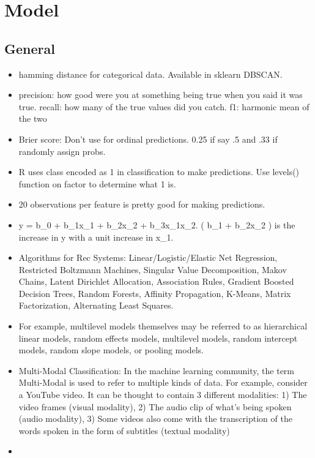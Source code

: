 \documentclass[]{book}
\theoremstyle{definition}
\theoremstyle{definition}
\theoremstyle{definition}
\theoremstyle{remark}
\begin{document}
\chapter{Model}\label{model-1}

\section{General}\label{general-1}

\begin{itemize}
\item
  hamming distance for categorical data. Available in sklearn DBSCAN.
\item
  precision: how good were you at something being true when you said it
  was true. recall: how many of the true values did you catch. f1:
  harmonic mean of the two
\item
  Brier score: Don't use for ordinal predictions. 0.25 if say .5 and .33
  if randomly assign probs.
\item
  R uses class encoded as 1 in classification to make predictions. Use
  levels() function on factor to determine what 1 is.
\item
  20 observations per feature is pretty good for making predictions.
\item
  y = b\_0 + b\_1x\_1 + b\_2x\_2 + b\_3x\_1x\_2. ( b\_1 + b\_2x\_2 ) is
  the increase in y with a unit increase in x\_1.
\item
  Algorithms for Rec Systems: Linear/Logistic/Elastic Net Regression,
  Restricted Boltzmann Machines, Singular Value Decomposition, Makov
  Chains, Latent Dirichlet Allocation, Association Rules, Gradient
  Boosted Decision Trees, Random Forests, Affinity Propagation, K-Means,
  Matrix Factorization, Alternating Least Squares.
\item
  For example, multilevel models themselves may be referred to as
  hierarchical linear models, random effects models, multilevel models,
  random intercept models, random slope models, or pooling models.
\item
  Multi-Modal Classification: In the machine learning community, the
  term Multi-Modal is used to refer to multiple kinds of data. For
  example, consider a YouTube video. It can be thought to contain 3
  different modalities: 1) The video frames (visual modality), 2) The
  audio clip of what's being spoken (audio modality), 3) Some videos
  also come with the transcription of the words spoken in the form of
  subtitles (textual modality)
\item

\end{itemize}
\end{document}

